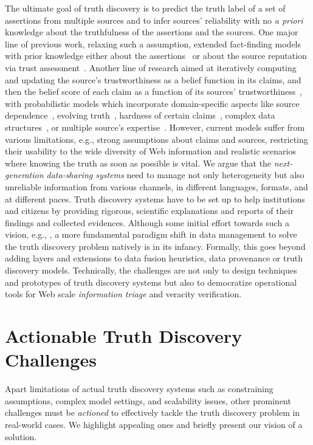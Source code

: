 \documentclass[prodmode,acmtecs]{acmsmall} %
\begin{document}
The ultimate goal of truth discovery is to predict the truth label of a set of assertions from multiple sources
 and to infer sources' reliability with no \emph{a priori} knowledge about the truthfulness of the assertions and the sources. One 
major line of previous work, relaxing such a assumption, extended fact-finding models with prior knowledge either about the assertions~\cite{PasternackR13} 
or about the source reputation via trust assessment~\cite{BalakrishnanK11}. Another line of research aimed at iteratively computing and updating the source's
trustworthiness as a belief function in its claims, and then the belief score of each claim as a function of its sources' trustworthiness~\cite{YinHY08}, with 
probabilistic models which incorporate domain-specific aspects like source dependence~\cite{DongBHS10a}, evolving truth~\cite{DongBS09a}, hardness of certain 
claims~\cite{GallandAMS10}, complex data structures~\cite{ZhaoRGH12,GoasdoueKKLMZ13}, or multiple source's expertise~\cite{Ma15}. However, current models suffer 
from various limitations, e.g., strong assumptions about claims and sources, restricting their usability to the wide diversity of Web information and realistic 
scenarios where knowing the truth as soon as possible is vital. 
 We argue that the \emph{next-generation data-sharing systems} need to manage not only heterogeneity but also unreliable 
 information from various channels, in different languages, formats, and at different paces. Truth discovery systems 
 have to be set up to help institutions and citizens by providing rigorous, scientific explanations and reports 
 of their findings and collected evidences. Although some initial effort towards such a vision,
 e.g., \cite{DongS2013,DongBHS10a,LiDLMS12}, a more fundamental paradigm shift in data
 management to solve the truth discovery problem natively is in its infancy. Formally, this goes beyond adding layers and extensions to
 data fusion heuristics, data provenance or truth discovery models. Technically, the challenges are not only to  design 
 techniques and prototypes of truth discovery systems but also to democratize operational tools for Web scale \emph{information
 triage} and veracity verification.
  
  
  

 
\section{Actionable Truth Discovery Challenges}
Apart limitations of actual truth discovery systems such as constraining assumptions, complex model settings, and scalability issues, other
prominent challenges must be \emph{actioned} to effectively tackle the truth discovery problem in real-world cases. We highlight appealing 
ones and briefly present our vision of a solution.
\end{document}
